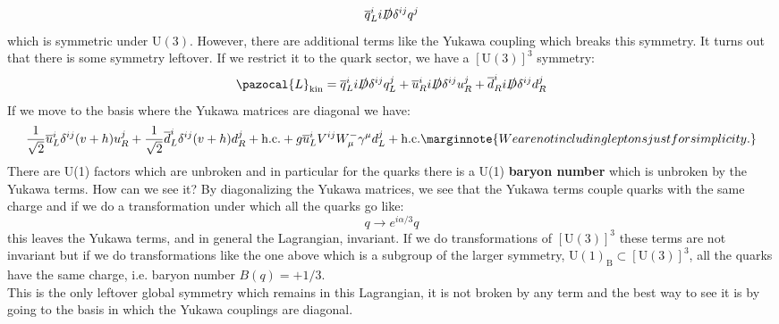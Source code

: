 \documentclass[../main.tex]{subfiles}
\begin{document}
\[
\overline{q}_L^ii\slashed{D}\delta^{ij}q^j
\]
which is symmetric under $\text{U}(3)$. However, there are additional terms like the Yukawa coupling which breaks this symmetry. It turns out that there is some symmetry leftover. If we restrict it to the quark sector, we have a $[\text{U}(3)]^3$ symmetry:
\[
\pazocal{L}_{\text{kin}}=\overline{q}_L^ii\slashed{D}\delta^{ij}q_L^j+\overline{u}_R^ii\slashed{D}\delta^{ij}u_R^j+\overline{d}_R^ii\slashed{D}\delta^{ij}d_R^j
\]
If we move to the basis where the Yukawa matrices are diagonal we have:
\[
\frac{1}{\sqrt{2}}\overline{u}_L^i\delta^{ij}(v+h)u_R^j+\frac{1}{\sqrt{2}}\overline{d}_L^i\delta^{ij}(v+h)d_R^j+\text{h.c.}+g\overline{u}_L^iV^{ij}W_\mu^-\gamma^\mu d_L^j+\text{h.c.}\marginnote{We are not including leptons just for simplicity.}
\]
There are U(1) factors which are unbroken and in particular for the quarks there is a U(1) \textbf{baryon number} which is unbroken by the Yukawa terms. How can we see it? By diagonalizing the Yukawa matrices, we see that the Yukawa terms couple quarks with the same charge and if we do a transformation under which all the quarks go like:
\[
q\to e^{i\alpha/3}q
\]
this leaves the Yukawa terms, and in general the Lagrangian, invariant. If we do transformations of $[\text{U}(3)]^3$ these terms are not invariant but if we do transformations like the one above which is a subgroup of the larger symmetry,  U$(1)_{\text{B}}\subset[\text{U}(3)]^3$, all the quarks have the same charge, i.e. baryon number $B(q)=+1/3$.\\
This is the only leftover global symmetry which remains in this Lagrangian, it is not broken by any term and the best way to see it is by going to the basis in which the Yukawa couplings are diagonal.
\end{document}
